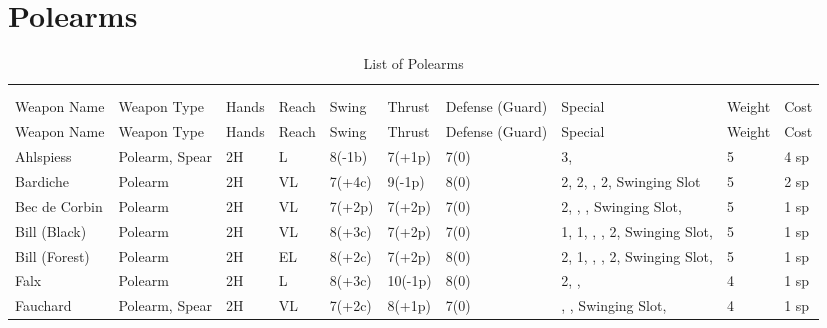 \documentclass[oneside,11pt,english]{book}
\begin{document}
\section{Polearms}\vspace{-15pt}
\begin{longtabu} to 1\linewidth {X[2,l]XX[-1,c]X[-1,c]XXX[-1,c]X[2,l]X[-3,c]X[-3,r]}
	\captionsetup{labelformat=blank,textformat=empty}
	\caption{List of Polearms}\vspace{-15pt}\\
	\label{tab:Polearms}\\
		Weapon Name						&Weapon Type	&Hands&Reach&Swing&Thrust&Defense (Guard)&Special						&Weight	&Cost\\\toprule\endfirsthead
Weapon Name						&Weapon Type			&Hands	&Reach	&Swing		&Thrust		&Defense (Guard)	&Special																	&Weight	&Cost\\\toprule\endhead
Ahlspiess						&Polearm, Spear 		&2H		&L		&8(-1b)		&7(+1p)		&7(0)				& 3,														&5		&4 sp\\
Bardiche						&Polearm				&2H		&VL		&7(+4c)		&9(-1p)		&8(0)				& 2,  2, ,  2, Swinging Slot				&5		&2 sp\\
Bec de Corbin					&Polearm				&2H		&VL		&7(+2p)		&7(+2p)		&7(0)				& 2, , , Swinging Slot, 					&5		&1 sp\\
Bill (Black)					&Polearm				&2H		&VL		&8(+3c)		&7(+2p)		&7(0)				& 1,  1, , ,  2, Swinging Slot,		&5		&1 sp\\
Bill (Forest)					&Polearm				&2H		&EL		&8(+2c)		&7(+2p)		&8(0)				& 2,  1, , ,  2, Swinging Slot,		&5		&1 sp\\
Falx							&Polearm				&2H		&L		&8(+3c)		&10(-1p)	&8(0)				& 2, , 									&4		&1 sp\\
Fauchard 						&Polearm, Spear			&2H		&VL		&7(+2c)		&8(+1p) 	&7(0)				&, , Swinging Slot,								&4		&1 sp\\

\end{longtabu}
\end{document}
